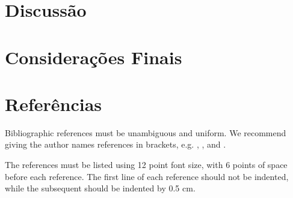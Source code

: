 \documentclass[12pt]{article}
\begin{document}
\section{Discussão}


\section{Considerações Finais}







\section{Referências}

Bibliographic references must be unambiguous and uniform.  We recommend giving
the author names references in brackets, e.g. \cite{knuth:84},
\cite{boulic:91}, and \cite{smith:99}.

The references must be listed using 12 point font size, with 6 points of space
before each reference. The first line of each reference should not be
indented, while the subsequent should be indented by 0.5 cm.



\end{document}

